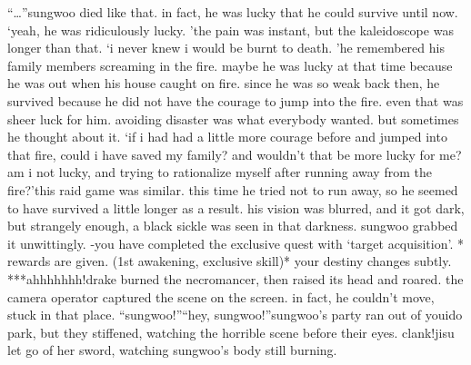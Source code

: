 “…”sungwoo died like that.
in fact, he was lucky that he could survive until now.
‘yeah, he was ridiculously lucky.
’the pain was instant, but the kaleidoscope was longer than that.
‘i never knew i would be burnt to death.
’he remembered his family members screaming in the fire.
 maybe he was lucky at that time because he was out when his house caught on fire.
since he was so weak back then, he survived because he did not have the courage to jump into the fire.
 even that was sheer luck for him.
 avoiding disaster was what everybody wanted.
but sometimes he thought about it.
 ‘if i had had a little more courage before and jumped into that fire, could i have saved my family? and wouldn’t that be more lucky for me? am i not lucky, and trying to rationalize myself after running away from the fire?’this raid game was similar.
 this time he tried not to run away, so he seemed to have survived a little longer as a result.
his vision was blurred, and it got dark, but strangely enough, a black sickle was seen in that darkness.
sungwoo grabbed it unwittingly.
-you have completed the exclusive quest  with ‘target acquisition’.
* rewards are given.
 (1st awakening, exclusive skill)* your destiny changes subtly.
***ahhhhhhh!drake burned the necromancer, then raised its head and roared.
the camera operator captured the scene on the screen.
 in fact, he couldn’t move, stuck in that place.
“sungwoo!”“hey, sungwoo!”sungwoo’s party ran out of youido park, but they stiffened, watching the horrible scene before their eyes.
clank!jisu let go of her sword, watching sungwoo’s body still burning.

